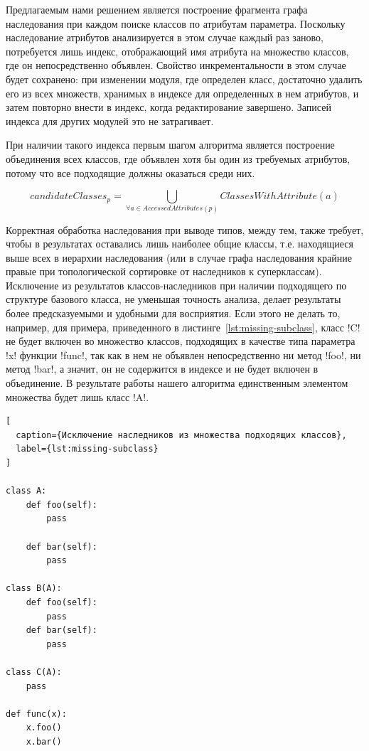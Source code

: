 Предлагаемым нами решением является построение фрагмента графа наследования при
каждом поиске классов по атрибутам параметра. Поскольку наследование атрибутов
анализируется в этом случае каждый раз заново, потребуется лишь индекс,
отображающий имя атрибута на множество классов, где он непосредственно объявлен.
Свойство инкрементальности в этом случае будет сохранено: при
изменении модуля, где определен класс, достаточно удалить его из всех множеств,
хранимых в индексе для определенных в нем атрибутов, и затем повторно внести в
индекс, когда редактирование завершено. Записей индекса для других модулей это
не затрагивает.

При наличии такого индекса первым шагом алгоритма является построение
объединения всех классов, где объявлен хотя бы один из требуемых атрибутов,
потому что все подходящие должны оказаться среди них.

\[
  candidateClasses_p = \bigcup_{\forall{a} \in AccessedAttributes(p)}
  ClassesWithAttribute(a)
\]

Корректная обработка наследования при выводе типов, между тем, также требует,
чтобы в результатах оставались лишь наиболее общие классы, т.е. находящиеся выше
всех в иерархии наследования (или в случае графа наследования крайние правые при
топологической сортировке от наследников к суперклассам). Исключение из
результатов классов-наследников при наличии подходящего по структуре базового
класса, не уменьшая точность анализа, делает результаты более предсказуемыми и
удобными для восприятия. Если этого не делать то, например, для
примера, приведенного в листинге~\ref{lst:missing-subclass}, класс !C! не будет
включен во множество классов, подходящих в качестве типа параметра !x! функции
!func!, так как в нем не объявлен непосредственно ни метод !foo!, ни метод
!bar!, а значит, он не содержится в индексе и не будет включен в объединение. В
результате работы нашего алгоритма единственным элементом множества будет лишь
класс !A!.

\begin{lstlisting}[
  caption={Исключение наследников из множества подходящих классов},
  label={lst:missing-subclass}
]

class A:
    def foo(self):
        pass

    def bar(self):
        pass

class B(A):
    def foo(self):
        pass
    def bar(self):
        pass

class C(A):
    pass

def func(x):
    x.foo()
    x.bar()
    
\end{lstlisting}


